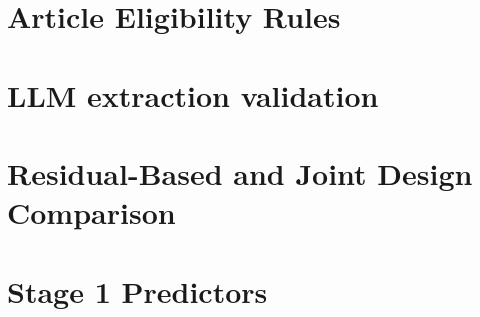 \documentclass[final-report]{report-template}
\begin{document}
\clearpage
\section{Article Eligibility Rules}
\begin{table}[htbp]
  \centering\small
  
  \caption{Pre-registered article eligibility rules. Inclusion criteria I1--I6 and exclusion rules E1--E10 were applied by script or human review as specified. E4 prevented result leakage, and positive or negative coverage did not affect eligibility.}
  \label{tab:a14-eligibility}
\end{table}

\clearpage
\section{LLM extraction validation}

\begin{table}[htbp]
  \centering\small
  
  \caption{Final verification evidence and determination conclusions for each extraction layer; threshold $\kappa \geq 0.60$, with values representing the figures after validator gating.}
  \label{tab:a5-llm-validation}
\end{table}

\clearpage
\section{Residual-Based and Joint Design Comparison}
\begin{table}[htbp]
  \centering\small
  
  \caption{Comparison of residual-based and joint models across 18 specifications, fitted on 2017 data and evaluated on 2021 data. This exploratory analysis was conducted after the final news-layer evaluation. The baseline-only column reports the Stage 1 baseline error without news features and serves as a reference.}
  \label{tab:a8-approach}
\end{table}

\clearpage
\section{Stage 1 Predictors}

\begin{table}[htbp]
  \centering
  \small
  
  \caption{The 35 original predictors used in the Stage 1 baseline model, taken from the published model feature schema. After encoding, these predictors formed 127 model input columns.}
  \label{tab:a1-predictors}
\end{table}
\end{document}
